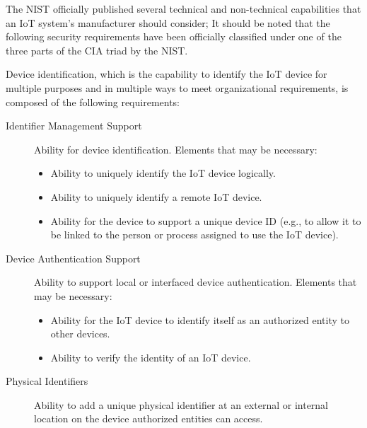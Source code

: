 The NIST officially published several technical and non-technical capabilities that an IoT system’s manufacturer should consider; It should be noted that the following security requirements have been officially classified under one of the three parts of the CIA triad by the NIST.

Device identification, which is the capability to identify the IoT device for multiple purposes and in multiple ways to meet organizational requirements, is composed of the following requirements:

\begin{description}
    \item[Identifier Management Support] Ability for device identification. Elements that may be necessary:
        \begin{itemize}
            \item Ability to uniquely identify the IoT device logically.
            \item Ability to uniquely identify a remote IoT device.
            \item Ability for the device to support a unique device ID (e.g., to allow it to be linked to the person or process assigned to use the IoT device).
        \end{itemize}
    \item[Device Authentication Support] Ability to support local or interfaced device authentication. Elements that may be necessary:
        \begin{itemize}
            \item Ability for the IoT device to identify itself as an authorized entity to other devices.
            \item Ability to verify the identity of an IoT device.
        \end{itemize}
    \item[Physical Identifiers] Ability to add a unique physical identifier at an external or internal location on the device authorized entities can access.
\end{description}

